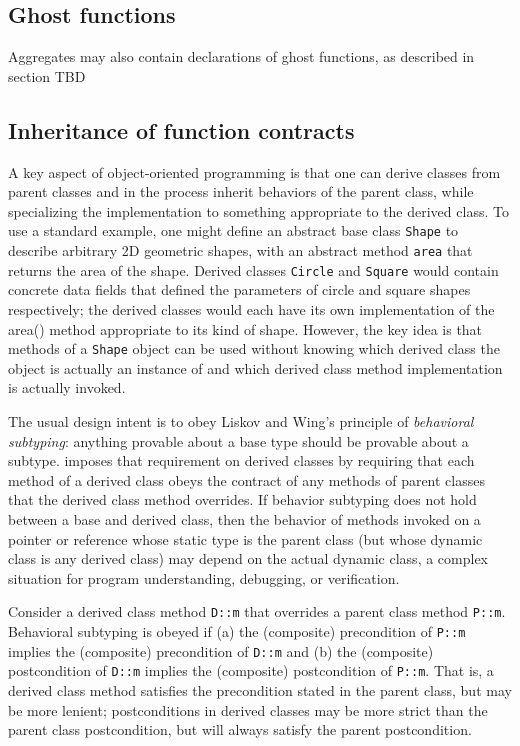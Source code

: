 \subsection{Ghost functions}
Aggregates may also contain declarations of ghost functions, as described in section TBD 


\subsection{Inheritance of function contracts}

A key aspect of object-oriented programming is 
that one can derive classes from parent classes and in 
the process inherit behaviors of the parent class, 
while specializing the implementation to something appropriate to the derived class. 
To use a standard example, 
one might define an abstract base class \lstinline|Shape| to describe arbitrary 2D geometric shapes, 
with an abstract method 
\lstinline|area| that returns the area of the shape. 
Derived classes \lstinline|Circle| and \lstinline|Square| would contain concrete data fields that defined the parameters of circle and square shapes respectively; 
the derived classes would each have its own implementation of the area() method appropriate to its kind of shape. 
However, the key idea is that methods of a \lstinline|Shape| object can be used without knowing which derived class the object is actually an instance of and
which derived class method implementation is actually invoked.

The usual design intent is to obey Liskov and Wing's principle of \textit{behavioral subtyping}\cite{Liskov:1994:BNS:197320.197383}: 
anything provable about a base type should be provable about a subtype.
\NAME{} imposes that requirement on derived classes by 
requiring that each method of a derived class obeys the contract of any methods of parent classes that the derived class method overrides. 
If behavior subtyping does not hold between a base and derived class, then the behavior of methods
invoked on a pointer or reference whose static type is the
parent class (but whose dynamic class is any derived class) may depend on the actual dynamic class, 
a complex situation for program understanding, debugging, or verification.

Consider a derived class method \lstinline|D::m| that overrides a parent class method \lstinline|P::m|.
Behavioral subtyping is obeyed if (a) the (composite) precondition of
\lstinline|P::m| implies the (composite) precondition of 
\lstinline|D::m| and (b) the (composite) postcondition of
\lstinline|D::m| implies the (composite) postcondition of 
\lstinline|P::m|. That is, a derived class method satisfies the precondition stated in the parent class, but may be more lenient; 
postconditions in derived classes may be more strict than the parent class postcondition, but will always 
satisfy the parent postcondition. 


